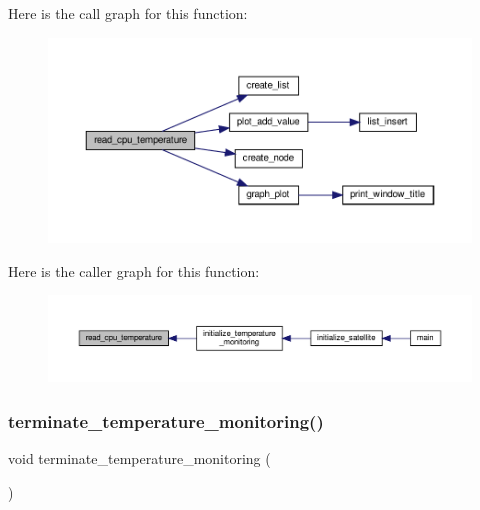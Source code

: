 Here is the call graph for this function\+:\nopagebreak
\begin{figure}[H]
\begin{center}
\leavevmode
\includegraphics[width=350pt]{temperature-monitoring_8c_a6a33eb327dd6b9aac62b32cf7220cca0_cgraph}
\end{center}
\end{figure}
Here is the caller graph for this function\+:\nopagebreak
\begin{figure}[H]
\begin{center}
\leavevmode
\includegraphics[width=350pt]{temperature-monitoring_8c_a6a33eb327dd6b9aac62b32cf7220cca0_icgraph}
\end{center}
\end{figure}
\mbox{\label{temperature-monitoring_8c_a8b1be00dadac2a3d808233430fb2cf8b}} 
\subsubsection{\texorpdfstring{terminate\+\_\+temperature\+\_\+monitoring()}{terminate\_temperature\_monitoring()}}
{\footnotesize\ttfamily void terminate\+\_\+temperature\+\_\+monitoring (\begin{DoxyParamCaption}{ }\end{DoxyParamCaption})}

